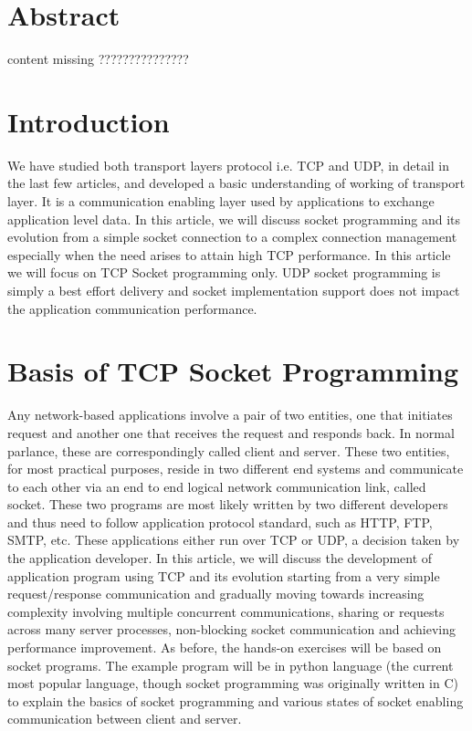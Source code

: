 \begin{multicols}{2}


\section*{Abstract}

content missing ???????????????

\section{Introduction}
 
\vspace{-.2cm}
 
 We have studied both transport layers protocol i.e. TCP\cite{art1-key01} and UDP\cite{art1-key02}, in detail in the last few articles, and developed a basic understanding of working of transport layer. It is a communication enabling layer used by applications to exchange application level data. In this article, we will discuss socket programming and its evolution from a simple socket connection to a complex connection management especially when the need arises to attain high TCP performance.  In this article we will focus on TCP Socket programming only. UDP socket programming is simply a best effort delivery and socket implementation support does not impact the application communication performance.

\vspace{-.3cm}

\section{Basis of TCP Socket Programming}

\vspace{-.2cm}

Any network-based applications involve a pair of two entities, one that initiates request and another one that receives the request and responds back. In normal parlance, these are correspondingly called client and server. These two entities, for most practical purposes, reside in two different end systems and communicate to each other via an end to end logical network communication link, called socket. These two programs are most likely written by two different developers and thus need to follow application protocol standard, such as HTTP, FTP, SMTP, etc.  These applications either run over TCP or UDP, a decision taken by the application developer. In this article, we will discuss the development of application program using TCP and its evolution starting from a very simple request/response communication and gradually moving towards increasing complexity involving multiple concurrent communications, sharing or requests across many server processes, non-blocking socket communication and achieving performance improvement. As before, the hands-on exercises will be based on socket programs.  The example program will be in python language (the current most popular language, though socket programming was originally written in C) to explain the basics of socket programming and various states of socket enabling communication between client and server.


\end{multicols}

